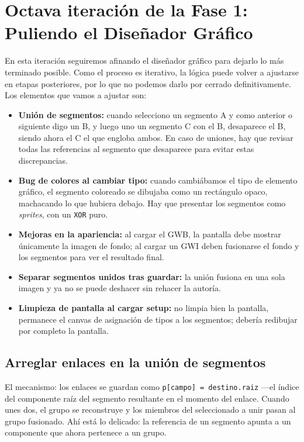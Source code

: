 \section{Octava iteración de la Fase 1: Puliendo el Diseñador Gráfico}
\label{sec:PuliendoDisenadorGrafico}

En esta iteración seguiremos afinando el diseñador gráfico para
dejarlo lo más terminado posible. Como el proceso es iterativo, la
lógica puede volver a ajustarse en etapas posteriores, por lo que no
podemos darlo por cerrado definitivamente. Los elementos que vamos a
ajustar son:

\begin{itemize}
	\item \textbf{Unión de segmentos:} cuando selecciono un segmento A y como anterior o siguiente digo un B, y luego uno un segmento C con el B, desaparece el B, siendo ahora el C el que engloba ambos. En caso de uniones, hay que revisar todas las referencias al segmento que desaparece para evitar estas discrepancias.
	\item \textbf{Bug de colores al cambiar tipo:} cuando cambiábamos el tipo de elemento gráfico, el segmento coloreado se dibujaba como un rectángulo opaco, machacando lo que hubiera debajo. Hay que presentar los segmentos como \textit{sprites}, con un \texttt{XOR} puro.
	\item \textbf{Mejoras en la apariencia:} al cargar el GWB, la pantalla debe mostrar únicamente la imagen de fondo; al cargar un GWI deben fusionarse el fondo y los segmentos para ver el resultado final.
	\item \textbf{Separar segmentos unidos tras guardar:} la unión fusiona en una sola imagen y ya no se puede deshacer sin rehacer la autoría.
	\item \textbf{Limpieza de pantalla al cargar setup:} no limpia bien la pantalla, permanece el canvas de asignación de tipos a los segmentos; debería redibujar por completo la pantalla.
\end{itemize}

\subsection{Arreglar enlaces en la unión de segmentos}

El mecanismo: los enlaces se guardan como \texttt{p[campo] = destino.raiz} ---el índice del componente raíz del segmento resultante en el momento del enlace. Cuando unes dos, el grupo se reconstruye y los miembros del seleccionado a unir pasan al grupo fusionado. Ahí está lo delicado: la referencia de un segmento apunta a un componente que ahora pertenece a un grupo.

